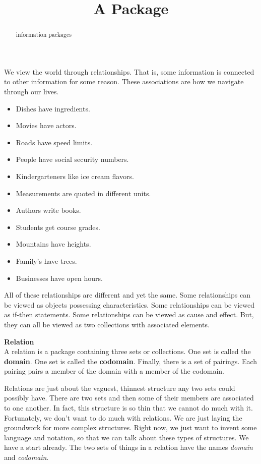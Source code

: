\documentclass{ximera}
\title{A Package}
\begin{document}
\begin{abstract}
information packages
\end{abstract}
\maketitle


We view the world through relationships. That is, some information is connected to other information for some reason. These associations are how we navigate through our lives.

\begin{itemize}
\item Dishes have ingredients.
\item Movies have actors.
\item Roads have speed limits.
\item People have social security numbers.
\item Kindergarteners like ice cream flavors.
\item Measurements are quoted in different units.
\item Authors write books.
\item Students get course grades.
\item Mountains have heights.
\item Family's have trees.
\item Businesses have open hours.
\end{itemize}


All of these relationships are different and yet the same.  Some relationships can be viewed as objects possessing characteristics. Some relationships can be viewed as if-then statements.  Some relationships can be viewed as cause and effect. But, they can all be viewed as two collections with associated elements.







\begin{definition} \textbf{Relation} \\
A relation is a package containing three sets or collections. One set is called the \textbf{domain}. One set is called the \textbf{codomain}.  Finally, there is a set of pairings.  Each pairing pairs a member of the domain with a member of the codomain.
\end{definition}


Relations are just about the vaguest, thinnest structure any two sets could possibly have. There are two sets and then some of their members are associated to one another. In fact, this structure is so thin that we cannot do much with it.  Fortunately, we don't want to do much with relations.  We are just laying the groundwork for more complex structures.  Right now, we just want to invent some language and notation, so that we can talk about these types of structures. We have a start already. The two sets of things in a relation have the names \textit{domain} and \textit{codomain}.
\end{document}
